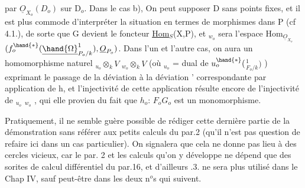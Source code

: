 
par $\underline{O}_{X_o}(D_o)$ sur D$_o$. Dans le cas b), On peut supposer D sans points
fixes, et il est plus commode d'interpréter la situation en termes de
morphismes dans P (cf 4.1.), de sorte que G devient le foncteur
\underline{Hom}$_S$(X,P), et $_{w_o}$ sera l'espace  Hom$_{\underline{O}_{X_o}}$$(f_o^{\hand{*}}(\underline{\hand{\Omega}}^{1}_{P_o/k}), \underline{O}_{P_o})$.
Dans l'un et l'autre cas, on aura un homomorphisme naturel
$_{u_o}\otimes_k V$ \hand{$\to$} $_{w_o}\otimes_k V$ (où $_{u_o}$ = dual de $u_o^{\hand{*}}($\hand{$\Omega$}$^{1}_{F_o/k})$ ) exprimant le passage
de la déviation \hand{$\delta$} à la déviation \hand{$\delta$}' correspondante par application de h,
et l'injectivité de cette application résulte encore de l'injectivité
de $_{u_o}$\hand{$\to$} $_{w_o}$ , qui elle provien du fait que $h_o$: $F_o$\hand{$\to$}$G_o$ est un
monomorphisme.

Pratiquement, il ne semble guère possible de rédiger cette dernière
partie de la démonstration sans référer aux petits calculs du par.2
(qu'il n'est pas question de refaire ici dans un cas particulier). On
signalera que cela ne donne pas lieu à des cercles vicieux, car le par.
2  et les calculs qu'on y  développe ne dépend que des sorites
de calcul différentiel du par.16, et d'ailleurs .3. ne sera plus
utilisé dans le Chap IV, sauf peut-être dans les deux n$^{o}$s qui suivent.

